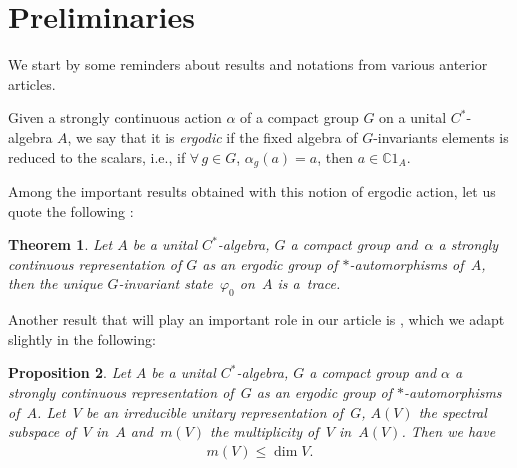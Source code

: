 \documentclass[pdftex]{sigma}
\newtheorem{Theorem}{Theorem}[section]
\newtheorem{Proposition}[Theorem]{Proposition}
 { \theoremstyle{definition}
\newtheorem{Definition}[Theorem]{Definition}
\newtheorem{Note}[Theorem]{Note}
\newtheorem{Example}[Theorem]{Example}
\newtheorem{Remark}[Theorem]{Remark} }
\newcommand{\C}{\mathbb{C}}
\numberwithin{equation}{section}
\begin{document}
\section{Preliminaries}
\label{Sec:Reminders}

We start by some reminders about results and notations from various anterior articles.
\begin{Definition}
Given a strongly continuous action $\alpha$ of a compact group $G$ on a unital $C^*$-algebra $A$, we say that it is \emph{ergodic} if the f\/ixed algebra of $G$-invariants elements is reduced to the scalars, i.e., if $\forall \, g \in G$, $\alpha_g(a) = a$, then $a \in \C 1_A$.
\end{Definition}

Among the important results obtained with this notion of ergodic action, let us quote the following \cite[Theorem~4.1, p.~82]{ErgodCpctGpHKLS}:
\begin{Theorem}
\label{Thm:ErgodAct}
Let $A$ be a unital $C^*$-algebra, $G$ a compact group and~$\alpha$ a strongly continuous representation of $G$ as an ergodic group of $*$-automorphisms of~$A$, then the unique $G$-invariant state~$\varphi_0$ on~$A$ is a~trace.
\end{Theorem}

Another result that will play an important role in our article is %
\cite[Proposition~2.1, p.~76]{ErgodCpctGpHKLS}, which we adapt slightly in the following:
\begin{Proposition}
\label{Prop:multiplicity}
Let $A$ be a unital $C^*$-algebra, $G$ a compact group and $\alpha$ a strongly continuous representation of~$G$ as an ergodic group of $*$-automorphisms of~$A$. Let~$V$ be an irreducible unitary representation of~$G$, $A(V)$ the spectral subspace of~$V$ in~$A$ and~$m(V)$ the multiplicity of~$V$ in~$A(V)$. Then we have
\begin{gather*}
m(V) \leqslant \dim V.
\end{gather*}
\end{Proposition}
\end{document}
